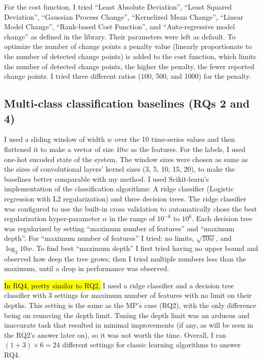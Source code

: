 For the cost function, I tried ``Least Absolute Deviation'', ``Least Squared Deviation'', ``Gaussian Process Change'', ``Kernelized Mean Change'', ``Linear Model Change'', ``Rank-based Cost Function'', and ``Auto-regressive model change'' as defined in the library. Their parameters were left as default.
To optimize the number of change points a penalty value (linearly proportionate to the number of detected change points) is added to the cost function, which limits the number of detected change points, the higher the penalty, the fewer reported change points. I tried three different ratios (100, 500, and 1000) for the penalty.

\subsection{Multi-class classification baselines (RQs 2 and 4)}
I used a sliding window of width $w$ over the 10 time-series values and then flattened it to make a vector of size $10w$ as the features. For the labels, I used one-hot encoded state of the system.
The window sizes were chosen as same as the sizes of convolutional layers' kernel sizes (3, 5, 10, 15, 20), to make the baselines better comparable with my method. 
I used Scikit-learn's implementation of the classification algorithms: A ridge classifier (Logistic regression with L2 regularization) and three decision trees. The ridge classifier was configured to use the built-in cross validation to automatically chose the best regularization hyper-parameter $\alpha$ in the range of $10^{-6}$ to $10^6$. Each decision tree was regularized by setting ``maximum number of features'' and ``maximum depth''. For ``maximum number of features'' I tried: no limits, $\sqrt{10w}$, and $\log_2{10w}$. To find best ``maximum depth'' I first tried having no upper bound and observed how deep the tree grows; then I tried multiple numbers less than the maximum, until a drop in performance was observed. 

\hl{In RQ4, pretty similar to RQ2,} I used a ridge classifier and a decision tree classifier with 3 settings for maximum number of features with no limit on their depths. This setting is the same as the MP's case (RQ2), with the only difference being on removing the depth limit. Tuning the depth limit was an arduous and inaccurate task that resulted in minimal improvements (if any, as will be seen in the RQ2's answer later on), so it was not worth the time. Overall, I ran $(1+3)\times6=24$ different settings for classic learning algorithms to answer RQ4. 



